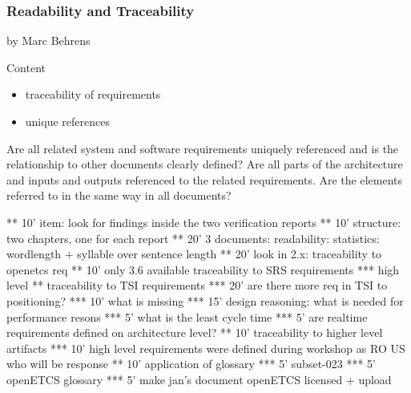\subsubsection{Readability and Traceability}

by Marc Behrens

Content
\begin{itemize}
\item traceability of requirements
\item unique references
\end{itemize}


Are all related system and software requirements uniquely referenced and is the relationship to other documents clearly defined?
Are all parts of the architecture and inputs and outputs referenced to the related requirements.
Are the elements referred to in the same way in all documents?

** 10' item: look for findings inside the two verification reports
**  10' structure: two chapters, one for each report
** 20' 3 documents: readability: statistics: wordlength + syllable over sentence length
** 20' look in 2.x: traceability to openetcs req
** 10' only 3.6 available traceability to SRS requirements
*** high level
** traceability to TSI requirements
*** 20' are there more req in TSI to positioning?
*** 10' what is missing
*** 15' design reasoning: what is needed for performance resons
*** 5' what is the least cycle time
*** 5' are realtime requirements defined on architecture level?
** 10' traceability to higher level artifacts
*** 10' high level requirements were defined during workshop as RO US 
  who will be response 
** 10' application of glossary
*** 5' subset-023  
*** 5' openETCS glossary
*** 5' make jan's document openETCS licensed + upload

